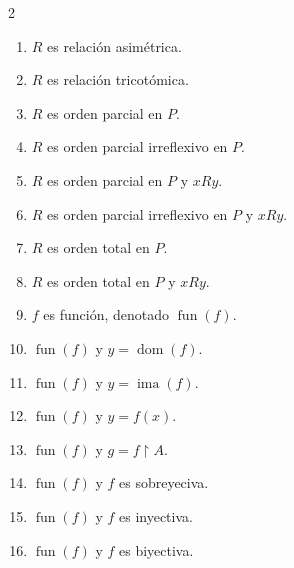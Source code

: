 \documentclass[letterpaper,DIV=15,12pt]{scrartcl}
\begin{document}
\begin{multicols}{2}
\begin{enumerate}
            \item $R$ es relación asimétrica.
            \item $R$ es relación tricotómica.
            \item $R$ es orden parcial en $P$.
            \item $R$ es orden parcial irreflexivo en $P$.
            \item $R$ es orden parcial en $P$ y $x R y$.
            \item $R$ es orden parcial irreflexivo en $P$ y $x R y$.
            \item $R$ es orden total en $P$.
            \item $R$ es orden total en $P$ y $x R y$.
            \item $f$ es función, denotado $\operatorname*{fun}(f)$.
            \item $\operatorname*{fun}(f)$ y $y=\operatorname*{dom}(f)$.
            \item $\operatorname*{fun}(f)$ y $y=\operatorname*{ima}(f)$.
            \item $\operatorname*{fun}(f)$ y $y=f(x)$.
            \item $\operatorname*{fun}(f)$ y $g=f \upharpoonright A$.
            \item $\operatorname*{fun}(f)$ y $f$ es sobreyeciva.
            \item $\operatorname*{fun}(f)$ y $f$ es inyectiva.
            \item $\operatorname*{fun}(f)$ y $f$ es biyectiva.
        \end{enumerate}
    \end{multicols}
\end{document}

